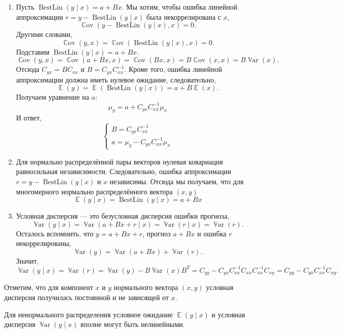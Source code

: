 \documentclass[12pt]{article}
\DeclareMathOperator{\Cov}{\mathbb{C}ov}
\DeclareMathOperator{\Var}{\mathbb{V}ar}
\DeclareMathOperator{\BestLin}{BestLin}
\DeclareMathOperator{\E}{\mathbb{E}}
\begin{document}
\begin{problem}
\begin{sol}
    \begin{enumerate}
    \item Пусть $\BestLin(y \mid x)  = a + B x$.
    Мы хотим, чтобы ошибка линейной аппроксимации $r=y - \BestLin(y \mid x)$ была некоррелирована с $x$,
    \[
    \Cov(y - \BestLin(y \mid x), x) = 0.
    \]
    Другими словами,
    \[
    \Cov(y, x) = \Cov(\BestLin(y \mid x), x) = 0.
    \]
    Подставим $\BestLin(y \mid x ) =a + Bx$.
    \[
    \Cov(y, x) = \Cov(a + Bx, x) = \Cov(Bx, x) = B\Cov(x, x) = B \Var(x).
    \]
    Отсюда $C_{yx} = B C_{xx}$ и $B = C_{yx}C_{xx}^{-1}$.
    Кроме того, ошибка линейной аппроксимации должна иметь нулевое ожидание, следовательно,
    \[
    \E(y) = \E(\BestLin(y \mid x)) = a  + B \E(x).
    \]
    Получаем уравнение на $a$:
    \[
    \mu_y = a + C_{yx} C_{xx}^{-1} \mu_x
    \]
    И ответ,
    \[
    \begin{cases}
        B = C_{yx}C_{xx}^{-1} \\
        a = \mu_y - C_{yx} C_{xx}^{-1} \mu_x
    \end{cases}
    \]
    \item Для нормально распределённой пары векторов  нулевая ковариация равносильная независимости.
    Следовательно, ошибка аппроксимации $r = y - \BestLin(y \mid x)$ и $x$ независимы.
    Отсюда мы получаем, что для многомерного нормально распределённого вектора $(x, y)$
    \[
    \E(y \mid x) = \BestLin(y \mid x) = a + Bx
    \]
    \item Условная дисперсия — это безусловная дисперсия ошибки прогноза,
    \[
    \Var(y \mid x) = \Var(a + Bx + r \mid x) = \Var(r \mid x) = \Var(r).
    \]
    Осталось вспомнить, что $y = a + Bx + r$, прогноз $a + Bx$ и ошибка $r$ некоррелированы,
    \[
    \Var(y) = \Var(a + Bx) + \Var(r).
    \]
    Значит,
    \[  
    \Var(y \mid x) = \Var(r) = \Var(y) - B\Var(x)B^T = C_{yy} - C_{yx}C_{xx}^{-1} C_{xx} C_{xx}^{-1}C_{xy} = C_{yy} - C_{yx}C_{xx}^{-1}C_{xy}.
    \]
    \end{enumerate}
    Отметим, что для компонент $x$ и $y$ нормального вектора $(x, y)$ условная дисперсия получилась постоянной и не зависящей от $x$. 
    
    Для ненормального распределения условное ожидание $\E(y \mid x)$ и условная дисперсия $\Var(y \mid x)$ вполне могут быть нелинейными.
\end{sol}

\end{problem}
\end{document}
